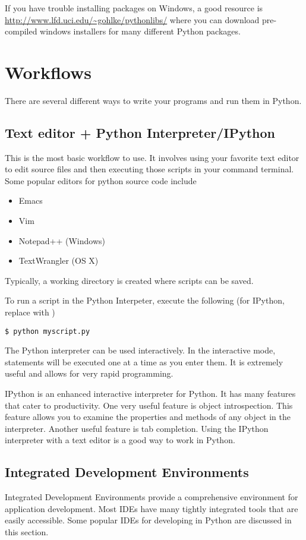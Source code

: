 If you have trouble installing packages on Windows, a good resource is \url{http://www.lfd.uci.edu/~gohlke/pythonlibs/} where you can download pre-compiled windows installers for many different Python packages.

\section*{Workflows}
There are several different ways to write your programs and run them in Python.

\subsection*{Text editor + Python Interpreter/IPython}
This is the most basic workflow to use.  
It involves using your favorite text editor to edit source files and then executing those scripts in your command terminal.  
Some popular editors for python source code include
\begin{itemize}
\item Emacs
\item Vim
\item Notepad++ (Windows)
\item TextWrangler (OS X)
\end{itemize}
Typically, a working directory is created where scripts can be saved.

To run a script in the Python Interpeter, execute the following (for IPython, replace  with )
\begin{verbatim}
$ python myscript.py
\end{verbatim}
The Python interpreter can be used interactively. 
In the interactive mode, statements will be executed one at a time as you enter them. 
It is extremely useful and allows for very rapid programming.

IPython is an enhanced interactive interpreter for Python.
It has many features that cater to productivity.
One very useful feature is object introspection.
This feature allows you to examine the properties and methods of any object in the interpreter.
Another useful feature is tab completion.
Using the IPython interpreter with a text editor is a good way to work in Python.

\subsection*{Integrated Development Environments}
Integrated Development Environments provide a comprehensive environment for application development. 
Most IDEs have many tightly integrated tools that are easily accessible. 
Some popular IDEs for developing in Python are discussed in this section.

